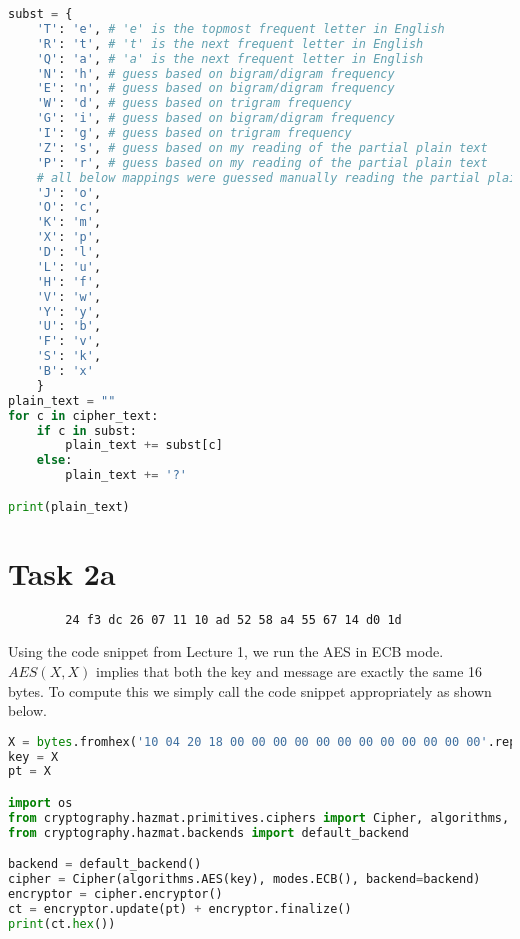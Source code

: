 \documentclass{article}
\begin{document}
    \begin{lstlisting}[language=Python]
subst = {
    'T': 'e', # 'e' is the topmost frequent letter in English
    'R': 't', # 't' is the next frequent letter in English
    'Q': 'a', # 'a' is the next frequent letter in English
    'N': 'h', # guess based on bigram/digram frequency
    'E': 'n', # guess based on bigram/digram frequency
    'W': 'd', # guess based on trigram frequency
    'G': 'i', # guess based on bigram/digram frequency
    'I': 'g', # guess based on trigram frequency
    'Z': 's', # guess based on my reading of the partial plain text
    'P': 'r', # guess based on my reading of the partial plain text
    # all below mappings were guessed manually reading the partial plain text
    'J': 'o',
    'O': 'c', 
    'K': 'm', 
    'X': 'p', 
    'D': 'l', 
    'L': 'u', 
    'H': 'f', 
    'V': 'w', 
    'Y': 'y', 
    'U': 'b', 
    'F': 'v', 
    'S': 'k', 
    'B': 'x'  
    }
plain_text = ""
for c in cipher_text:
    if c in subst:
        plain_text += subst[c]
    else:
        plain_text += '?'

print(plain_text)
    \end{lstlisting}

    \section*{Task 2a}
    \begin{verbatim}
        24 f3 dc 26 07 11 10 ad 52 58 a4 55 67 14 d0 1d
    \end{verbatim}

    Using the code snippet from Lecture 1, we run the AES in ECB mode. $AES(X, X)$ implies that both the key and message are exactly the same 16 bytes. To compute this we simply call the code snippet appropriately as shown below.

    \begin{lstlisting}[language=Python]
X = bytes.fromhex('10 04 20 18 00 00 00 00 00 00 00 00 00 00 00 00'.replace(' ', ''))
key = X
pt = X

import os
from cryptography.hazmat.primitives.ciphers import Cipher, algorithms, modes
from cryptography.hazmat.backends import default_backend

backend = default_backend()
cipher = Cipher(algorithms.AES(key), modes.ECB(), backend=backend)
encryptor = cipher.encryptor()
ct = encryptor.update(pt) + encryptor.finalize()
print(ct.hex())
    \end{lstlisting}
\end{document}
